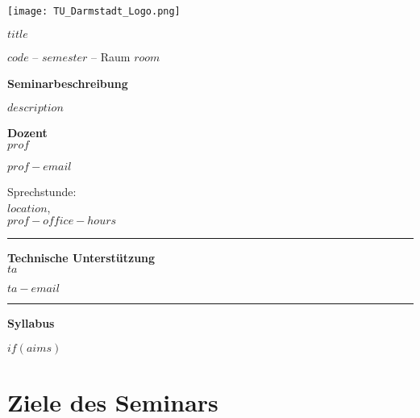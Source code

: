 \documentclass[11pt,a4paper]{article}
\author{$prof$}
\begin{document}
\hspace*{-1.25cm}
\texttt{[image: TU\_Darmstadt\_Logo.png]}
\vspace{0.25cm}

\begin{minipage}[t][58mm][t]{0.55\textwidth}

\textbf{\textcolor{TUColor}{$title$}}

$code$ -- $semester$ -- Raum $room$
\vspace{0.25cm}

\textbf{\textcolor{TUColor}{Seminarbeschreibung}}

$description$

\vspace{0.25cm}

\fontsize{8}{10}{\textbf{\textcolor{TUColor}{$program$}}}

\vspace{0.25cm}
	\end{minipage}%
	\hspace{0.5cm}\vrule{}\hspace{0.5cm}
	\begin{minipage}[t][75mm][t]{0.37\textwidth}
	\begin{minipage}[t][37mm][t]{\textwidth}
	\textbf{Dozent}\\
	
	$prof$
	
	\vspace{0.1cm}
	$prof-email$
	\vspace{0.1cm}
	
Sprechstunde: \\
$location$,\\
$prof-office-hours$
	
	\end{minipage}
	\vspace{1cm}\hrule{}\vspace{0.5cm}
	\begin{minipage}[t][28mm][t]{\textwidth}
	\textbf{Technische Unterstützung}\\
	
	$ta$

	\vspace{0.1cm}
	$ta-email$

	\end{minipage}
	\end{minipage}
	\hrule{}
	
\textbf{\textcolor{TUColor}{Syllabus}}	

$if(aims)$\section*{Ziele des Seminars}
\end{document}
